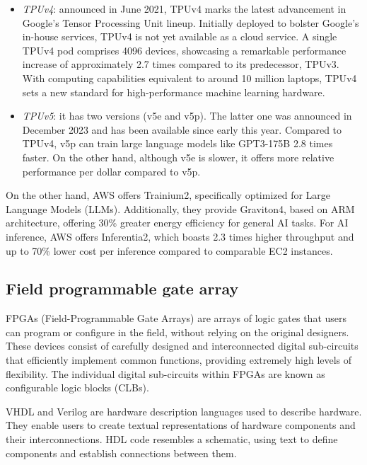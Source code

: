 \begin{itemize}
    \item \textit{TPUv4}: announced in June 2021, TPUv4 marks the latest advancement in Google's Tensor Processing Unit lineup. 
        Initially deployed to bolster Google's in-house services, TPUv4 is not yet available as a cloud service.
        A single TPUv4 pod comprises 4096 devices, showcasing a remarkable performance increase of approximately 2.7 times compared to its predecessor, TPUv3. 
        With computing capabilities equivalent to around 10 million laptops, TPUv4 sets a new standard for high-performance machine learning hardware.
    \item \textit{TPUv5}: it has two versions (v5e and v5p). 
        The latter one was announced in December 2023 and has been available since early this year.
        Compared to TPUv4, v5p can train large language models like GPT3-175B 2.8 times faster.
        On the other hand, although v5e is slower, it offers more relative performance per dollar compared to v5p.
\end{itemize}
On the other hand, AWS offers Trainium2, specifically optimized for Large Language Models (LLMs). 
Additionally, they provide Graviton4, based on ARM architecture, offering 30\% greater energy efficiency for general AI tasks. 
For AI inference, AWS offers Inferentia2, which boasts 2.3 times higher throughput and up to 70\% lower cost per inference compared to comparable EC2 instances.

\subsection{Field programmable gate array}
FPGAs (Field-Programmable Gate Arrays) are arrays of logic gates that users can program or configure in the field, without relying on the original designers.
These devices consist of carefully designed and interconnected digital sub-circuits that efficiently implement common functions, providing extremely high levels of flexibility. 
The individual digital sub-circuits within FPGAs are known as configurable logic blocks (CLBs).

VHDL and Verilog are hardware description languages used to describe hardware. 
They enable users to create textual representations of hardware components and their interconnections. 
HDL code resembles a schematic, using text to define components and establish connections between them.

